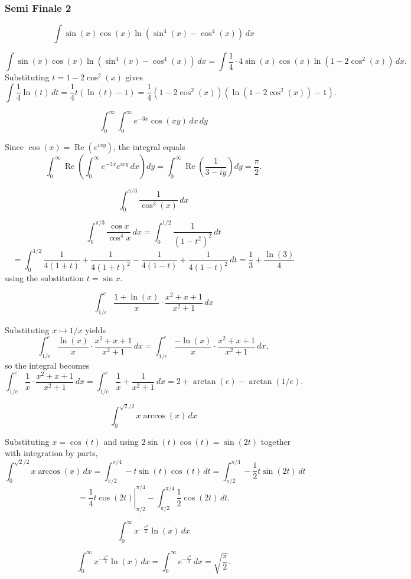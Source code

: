\subsubsection*{Semi Finale 2}
\begin{questions}

\question
\[ \int \sin(x)\cos(x)\ln\left(\sin^4(x)-\cos^4(x)\right)\, dx \]
\begin{solution}
\[ \int \sin(x)\cos(x)\ln\left(\sin^4(x)-\cos^4(x)\right)\, dx = \int \frac{1}{4}\cdot 4\sin(x)\cos(x)\ln(1-2\cos^2(x))\, dx. \]
Substituting $t=1-2\cos^2(x)$ gives
\[ \int \frac{1}{4}\ln(t)\, dt = \frac{1}{4}t(\ln(t)-1) = \frac{1}{4}(1-2\cos^2(x))(\ln(1-2\cos^2(x))-1). \]
\end{solution}

\question
\[ \int_0^\infty\int_0^\infty e^{-3x}\cos(xy)\, dx\, dy \]
\begin{solution}
Since $\cos(x)=\operatorname{Re}(e^{ixy})$, the integral equals
\[ \int_0^\infty \operatorname{Re}\left(\int_0^\infty e^{-3x}e^{ixy}\, dx\right) dy = \int_0^\infty \operatorname{Re}\left(\frac{1}{3-iy}\right) dy = \frac{\pi}{2}. \]
\end{solution}

\question
\[ \int_0^{\pi/3} \frac{1}{\cos^3(x)}\, dx \]
\begin{solution}
\[ \int_0^{\pi/3} \frac{\cos x}{\cos^4 x}\, dx = \int_0^{1/2} \frac{1}{(1-t^2)^2}\, dt \]
\[ = \int_0^{1/2} \frac{1}{4(1+t)}+\frac{1}{4(1+t)^2}-\frac{1}{4(1-t)}+\frac{1}{4(1-t)^2}\, dt = \frac{1}{3}+\frac{\ln(3)}{4} \]
using the substitution $t=\sin x$.
\end{solution}

\question
\[ \int_{1/e}^{e} \frac{1+\ln(x)}{x}\cdot\frac{x^2+x+1}{x^2+1}\, dx \]
\begin{solution}
Substituting $x\mapsto 1/x$ yields
\[ \int_{1/e}^{e} \frac{\ln(x)}{x}\cdot\frac{x^2+x+1}{x^2+1}\, dx = \int_{1/e}^{e} \frac{-\ln(x)}{x}\cdot\frac{x^2+x+1}{x^2+1}\, dx, \]
so the integral becomes
\[ \int_{1/e}^{e} \frac{1}{x}\cdot\frac{x^2+x+1}{x^2+1}\, dx = \int_{1/e}^{e} \frac{1}{x}+\frac{1}{x^2+1}\, dx = 2+\arctan(e)-\arctan(1/e). \]
\end{solution}

\question
\[ \int_0^{\sqrt{2}/2} x\arccos(x)\, dx \]
\begin{solution}
Substituting $x=\cos(t)$ and using $2\sin(t)\cos(t)=\sin(2t)$ together with integration by parts,
\[ \int_0^{\sqrt{2}/2} x\arccos(x)\, dx = \int_{\pi/2}^{\pi/4} -t\sin(t)\cos(t)\, dt = \int_{\pi/2}^{\pi/4} -\frac{1}{2}t\sin(2t)\, dt \]
\[ = \left.\frac{1}{4}t\cos(2t)\right|_{\pi/2}^{\pi/4} - \int_{\pi/2}^{\pi/4} \frac{1}{2}\cos(2t)\, dt. \]
\end{solution}

\question[Tiebreak]
\[ \int_0^\infty x^{-\frac{x^2}{2}}\ln(x)\, dx \]
\begin{solution}
\[ \int_0^\infty x^{-\frac{x^2}{2}}\ln(x)\, dx = \int_0^\infty e^{-\frac{x^2}{2}}\, dx = \sqrt{\frac{\pi}{2}}. \]
\end{solution}

\end{questions}

